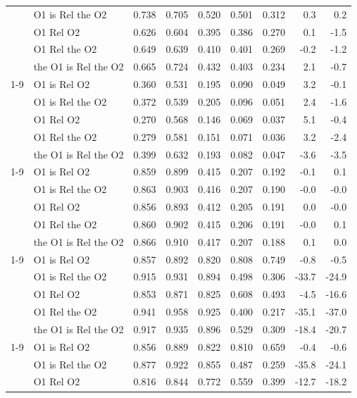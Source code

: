 \documentclass[10pt,twocolumn,letterpaper]{article}
\begin{document}
\begin{table}[!htp]
\begin{tabular}{llrrrrrrr}
 & O1 is Rel the O2 & 0.738 & 0.705 & 0.520 & 0.501 & 0.312 & 0.3 & 0.2 \\
 & O1 Rel O2 & 0.626 & 0.604 & 0.395 & 0.386 & 0.270 & 0.1 & -1.5 \\
 & O1 Rel the O2 & 0.649 & 0.639 & 0.410 & 0.401 & 0.269 & -0.2 & -1.2 \\
 & the O1 is Rel the O2 & 0.665 & 0.724 & 0.432 & 0.403 & 0.234 & 2.1 & -0.7 \\
\cline{1-9}
\multirow[t]{5}{*}{RTE DiT-nano} & O1 is Rel O2 & 0.360 & 0.531 & 0.195 & 0.090 & 0.049 & 3.2 & -0.1 \\
 & O1 is Rel the O2 & 0.372 & 0.539 & 0.205 & 0.096 & 0.051 & 2.4 & -1.6 \\
 & O1 Rel O2 & 0.270 & 0.568 & 0.146 & 0.069 & 0.037 & 5.1 & -0.4 \\
 & O1 Rel the O2 & 0.279 & 0.581 & 0.151 & 0.071 & 0.036 & 3.2 & -2.4 \\
 & the O1 is Rel the O2 & 0.399 & 0.632 & 0.193 & 0.082 & 0.047 & -3.6 & -3.5 \\
\cline{1-9}
\multirow[t]{5}{*}{RTE w/pos DiT-B} & O1 is Rel O2 & 0.859 & 0.899 & 0.415 & 0.207 & 0.192 & -0.1 & 0.1 \\
 & O1 is Rel the O2 & 0.863 & 0.903 & 0.416 & 0.207 & 0.190 & -0.0 & -0.0 \\
 & O1 Rel O2 & 0.856 & 0.893 & 0.412 & 0.205 & 0.191 & 0.0 & -0.0 \\
 & O1 Rel the O2 & 0.860 & 0.902 & 0.415 & 0.206 & 0.191 & -0.0 & 0.1 \\
 & the O1 is Rel the O2 & 0.866 & 0.910 & 0.417 & 0.207 & 0.188 & 0.1 & 0.0 \\
\cline{1-9}
\multirow[t]{5}{*}{T5 DiT-B} & O1 is Rel O2 & 0.857 & 0.892 & 0.820 & 0.808 & 0.749 & -0.8 & -0.5 \\
 & O1 is Rel the O2 & 0.915 & 0.931 & 0.894 & 0.498 & 0.306 & -33.7 & -24.9 \\
 & O1 Rel O2 & 0.853 & 0.871 & 0.825 & 0.608 & 0.493 & -4.5 & -16.6 \\
 & O1 Rel the O2 & 0.941 & 0.958 & 0.925 & 0.400 & 0.217 & -35.1 & -37.0 \\
 & the O1 is Rel the O2 & 0.917 & 0.935 & 0.896 & 0.529 & 0.309 & -18.4 & -20.7 \\
\cline{1-9}
\multirow[t]{5}{*}{T5 DiT-mini} & O1 is Rel O2 & 0.856 & 0.889 & 0.822 & 0.810 & 0.659 & -0.4 & -0.6 \\
 & O1 is Rel the O2 & 0.877 & 0.922 & 0.855 & 0.487 & 0.259 & -35.8 & -24.1 \\
 & O1 Rel O2 & 0.816 & 0.844 & 0.772 & 0.559 & 0.399 & -12.7 & -18.2 \\

\end{tabular}
\end{table}
\end{document}
